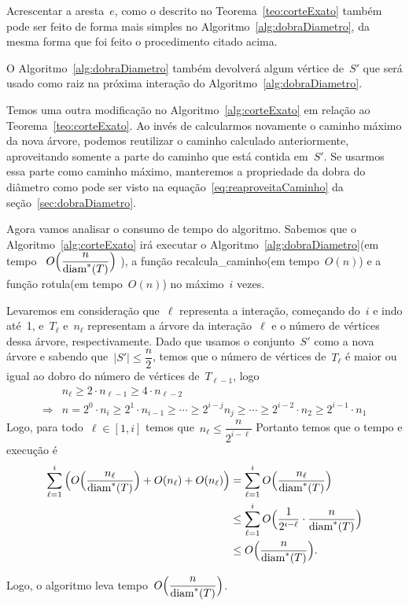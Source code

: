 		Acrescentar a aresta~$e$, como o descrito no
		Teorema~\ref{teo:corteExato} também pode ser feito de 
		forma mais simples no Algoritmo~\ref{alg:dobraDiametro},
		da mesma forma que foi feito o procedimento citado acima.

		O Algoritmo~\ref{alg:dobraDiametro} também devolverá 
		algum vértice de~$S'$ que será usado como raiz na 
		próxima interação do Algoritmo~\ref{alg:dobraDiametro}.

		Temos uma outra modificação no Algoritmo~\ref{alg:corteExato}   
		em relação ao Teorema~\ref{teo:corteExato}.
		Ao invés de calcularmos novamente o caminho máximo da nova
		árvore, podemos reutilizar o caminho calculado anteriormente,
		aproveitando somente a parte do caminho que está contida 
		em~$S'$. 
		Se usarmos essa parte como caminho máximo,
		manteremos a propriedade da dobra do diâmetro como pode
		ser visto na equação~\ref{eq:reaproveitaCaminho} da 
		seção~\ref{sec:dobraDiametro}.

		\bigskip

		Agora vamos analisar o consumo de tempo do algoritmo.
		Sabemos que o Algoritmo~\ref{alg:corteExato} irá executar
		o Algoritmo~\ref{alg:dobraDiametro}(em 
		tempo ~${O\Big(\dfrac{n}{\mathrm{diam}^*(T)}\Big)}$ ), a função
		{\sc recalcula\_caminho}(em tempo~$O(n)$) e a função
		{\sc rotula}(em tempo~$O(n)$) no máximo~$i$ vezes.

		Levaremos em consideração que~$\ell$ representa a interação,
		começando do~$i$ e indo até~1, e~$T_\ell$ e~$n_\ell$ 
		representam a árvore da interação~$\ell$ e
		o número de vértices dessa árvore, respectivamente.
		Dado que usamos o conjunto~$S'$ como a nova árvore
		e sabendo que~$|S'|\le \dfrac{n}{2}$,
		temos que o número de vértices de~$T_{\ell}$
		é maior ou igual ao 
		dobro do número de vértices de~$T_{\ell-1}$, logo
		\begin{align}
			 & n_{\ell} \ge 2\cdot n_{\ell-1} \ge 4\cdot n_{\ell-2} \nonumber\\
			\Rightarrow & n = 2^0\cdot n_i\ge 2^1\cdot n_{i-1} \ge\cdots\ge
			2^{i-j}n_j\ge\cdots\ge
			 2^{i-2}\cdot n_{2}\ge 2^{i-1}\cdot n_1 \nonumber 
		\end{align}
		Logo, para todo~$\ell\in[1,i]$ temos que~$n_\ell \le\dfrac{n} {2^{i-\ell}}$
		Portanto temos que o tempo e execução é
		\begin{align}
			\displaystyle\sum_{\ell=1}^{i} \Big(O\Big(\dfrac{n_\ell}{\mathrm{diam}^*(T)}\Big)
			+ O(n_\ell) + O(n_\ell)\Big)
			&= \displaystyle\sum_{\ell=1}^{i} O\Big(\dfrac{n_\ell}{\mathrm{diam}^*(T)}\Big) \nonumber\\
			&\le \displaystyle\sum_{\ell=1}^{i} O\Big(\dfrac{1}{2^{i-\ell}}
			\cdot\dfrac{n}{\mathrm{diam}^*(T)}\Big) \nonumber\\
			&\le O\Big(\dfrac{n}{\mathrm{diam}^*(T)}\Big). \nonumber
		\end{align}

		Logo, o algoritmo leva tempo~$O\Big(\dfrac{n}{\mathrm{diam}^*(T)}\Big)$.
